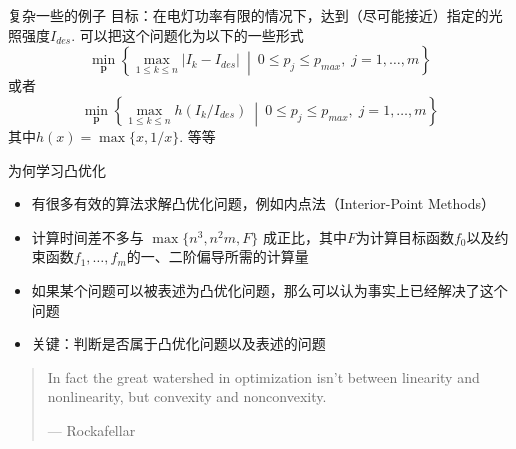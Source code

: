 
\begin{frame}

\begin{block}{复杂一些的例子}
目标：在电灯功率有限的情况下，达到（尽可能接近）指定的光照强度$I_{des}$. 可以把这个问题化为以下的一些形式
\[\min\limits_{\mathbf{p}} \left\{ \max\limits_{1\le k \le n} |I_k - I_{des}| \ \middle|\ 0 \le p_j \le p_{max}, \; j = 1,\ldots,m \right\}\]
或者
\[\min\limits_{\mathbf{p}} \left\{ \max\limits_{1\le k \le n} h(I_k / I_{des}) \ \middle|\ 0 \le p_j \le p_{max}, \; j = 1,\ldots,m \right\}\]
其中$h(x) = \max\{x,1/x\}$. 等等
\end{block}

\end{frame}


\begin{frame}

\begin{block}{为何学习凸优化}
\begin{itemize}
\item 有很多有效的算法求解凸优化问题，例如内点法（Interior-Point Methods）
\item 计算时间差不多与 $\max \{ n^3, n^2m, F \}$ 成正比，其中$F$为计算目标函数$f_0$以及约束函数$f_1,\ldots,f_m$的一、二阶偏导所需的计算量
\item 如果某个问题可以被表述为凸优化问题，那么可以认为事实上已经解决了这个问题
\item 关键：判断是否属于凸优化问题以及表述的问题
\end{itemize}

\vspace{1em}

\begin{quote}
\footnotesize
In fact the great watershed in optimization isn’t between linearity and nonlinearity, but convexity and nonconvexity.

\begin{flushright}
--- Rockafellar
\end{flushright}
\end{quote}
\end{block}

\end{frame}



